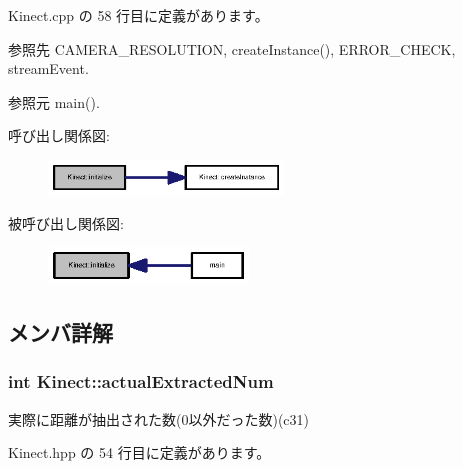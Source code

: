  Kinect.\-cpp の 58 行目に定義があります。



参照先 C\-A\-M\-E\-R\-A\-\_\-\-R\-E\-S\-O\-L\-U\-T\-I\-O\-N, create\-Instance(), E\-R\-R\-O\-R\-\_\-\-C\-H\-E\-C\-K, stream\-Event.



参照元 main().



呼び出し関係図\-:\nopagebreak
\begin{figure}[H]
\begin{center}
\leavevmode
\includegraphics[width=177pt]{class_kinect_a79f66d96dc810bf09a9d3cfe4f1f2671_cgraph}
\end{center}
\end{figure}




被呼び出し関係図\-:\nopagebreak
\begin{figure}[H]
\begin{center}
\leavevmode
\includegraphics[width=151pt]{class_kinect_a79f66d96dc810bf09a9d3cfe4f1f2671_icgraph}
\end{center}
\end{figure}




\subsection{メンバ詳解}
\subsubsection[{actual\-Extracted\-Num}]{\setlength{\rightskip}{0pt plus 5cm}int Kinect\-::actual\-Extracted\-Num}\label{class_kinect_a0ca66b49a986c739058afb116f87a257}


実際に距離が抽出された数(0以外だった数)(c31) 



 Kinect.\-hpp の 54 行目に定義があります。

